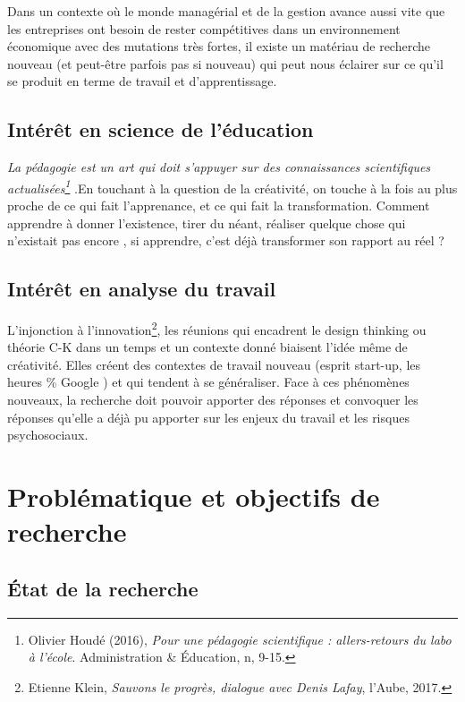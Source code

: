 \documentclass{article}
\begin{document}
Dans un contexte où le monde managérial et de la gestion avance aussi vite que les entreprises ont besoin de rester compétitives dans un environnement économique avec des mutations très fortes, il existe un matériau de recherche nouveau (et peut-être parfois pas si nouveau) qui peut nous éclairer sur ce qu'il se produit en terme de travail et d'apprentissage.

\subsection{Intérêt en science de l'éducation}

\og \textit{La pédagogie est un art qui doit s'appuyer sur des connaissances scientifiques actualisées\footnote{Olivier Houdé (2016), \emph{Pour une pédagogie scientifique : allers-retours du labo à l'école}. Administration \& Éducation, n, 9-15.} }.\fg En touchant à la question de la créativité, on touche à la fois au plus proche de ce qui fait l'apprenance, et ce qui fait la transformation. Comment apprendre à \og donner l'existence, tirer du néant, réaliser quelque chose qui n'existait pas encore \fg{}, si apprendre, c'est déjà transformer son rapport au réel ?

\subsection{Intérêt en analyse du travail}

L'injonction à l'innovation\footnote{Etienne Klein, \emph{Sauvons le progrès, dialogue avec Denis Lafay}, l’Aube, 2017.}, les réunions qui encadrent le \og design thinking \fg{} ou \og théorie C-K \fg{} dans un temps et un contexte donné biaisent l'idée même de créativité.
Elles créent des contextes de travail nouveau (esprit start-up, les heures \% Google \fg{}) et qui tendent à se généraliser. 
Face à ces phénomènes nouveaux, la recherche doit pouvoir apporter des réponses et convoquer les réponses qu'elle a déjà pu apporter sur les enjeux du travail et les risques psychosociaux.

\section{Problématique et objectifs de recherche}

\subsection{État de la recherche}
\end{document}
